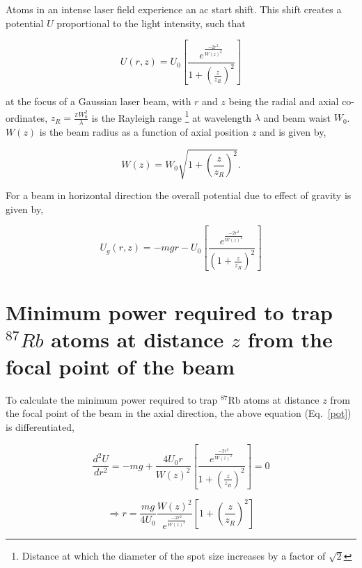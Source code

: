 \documentclass[amssymb,amsmath,aps,prl,twocolumn]{revtex4}
\begin{document}
Atoms in an intense laser field experience an ac start shift. This shift 
creates a potential $U$ proportional to the light intensity, such that

\begin{equation}
U(r,z)=U_{0}\left[\frac{e^{\frac{-2r^{2}}{W(z)^{2}}}}
{1+(\frac{z}{z_{R}})^{2}}\right]
\end{equation}

\noindent at the focus of a Gaussian laser beam, with $r$ and $z$ being the radial and axial co-ordinates, $z_{R}=\frac{\pi W_{0}^{2}}{\lambda}$ is the Rayleigh
range \footnote{Distance at which the diameter of the spot size
increases by a factor of $\sqrt{2}$} at wavelength $\lambda$ and
beam waist $W_{0}$. $W(z)$ is the beam radius as a function of
axial position $z$ and is given by,

\begin{equation}
W(z)=W_{0}\sqrt{1+\left(\frac{z}{z_{R}}\right)^{2}}.
\end{equation}

\noindent For a beam in horizontal direction the overall potential
due to effect of gravity is given by,

\begin{equation}
U_{g}(r,z)= - mgr -
U_{0}\left[\frac{e^{\frac{-2r^{2}}{W(z)^{2}}}}{\left(1 +
\frac{z}{z_{R}}\right)^{2}}\right]
\label{pot}
\end{equation}


\section{Minimum power required to trap $^{87}Rb$ atoms at distance $z$ from
the focal point of the beam}

To calculate the minimum power required to trap $^{87}$Rb atoms at
distance $z$ from the focal point of the beam in the axial
direction, the above equation (Eq.~\ref{pot}) is differentiated,

\begin{equation}
\frac{d^{2}U}{dr^{2}}= -mg+\frac{4U_{0}r}{W(z)^{2}}\left[\frac{e^
{\frac{-2r^{2}}{W(z)^{2}}}}{1 + (\frac{z}{z_{R}})^{2}}\right]=0
\end{equation}

\begin{equation}
\Longrightarrow r =
\frac{mg}{4U_{0}}\frac{W(z)^{2}}{e^{\frac{-2r^{2}}{W(z)^{2}}}}
\left[1+\left(\frac{z} {z_{R}}\right)^{2}\right] \label{diffpot}
\end{equation}
\end{document}
